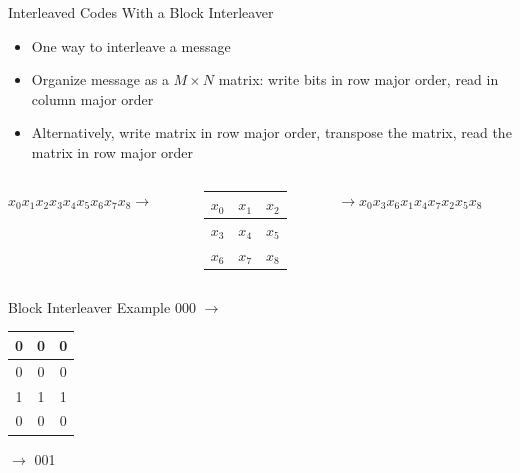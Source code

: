 \documentclass[aspectratio=169]{beamer}
\makeatletter
\newcommand{\err}[1]{{\color{sigma@alertred}#1}}
\newcommand{\blu}[1]{{\color{sigma@mainblue}#1}}
\newcommand{\lgreen}[1]{{\color{LightGreen}#1}}
\makeatother
\begin{document}
\begin{frame}{Interleaved Codes With a Block Interleaver}
    \begin{itemize}
        \item One way to interleave a message
        \item Organize message as a $M \times N$ matrix: write bits in row major order, read in column major order
        \item Alternatively, write matrix in row major order, transpose the matrix, read the matrix in row major order
    \end{itemize}
    \begin{columns}[c]
    \begin{column}{4cm}
    $x_0 x_1 x_2 x_3 x_4 x_5 x_6 x_7 x_8 \to$
    \end{column}
    \begin{column}{2cm}
    \begin{table}
        \centering
        \begin{tabular}{|c|c|c|}
            \hline 
            $x_0$ & $x_1$ & $x_2$ \\ \hline
            $x_3$ & $x_4$ & $x_5$ \\ \hline
            $x_6$ & $x_7$ & $x_8$ \\ \hline
        \end{tabular}
    \end{table}
    \end{column}
    \begin{column}{5cm}
        $\to x_0 x_3 x_6 x_1 x_4 x_7 x_2 x_5 x_8$
    \end{column}
    \end{columns}
\end{frame}


\begin{frame}{Block Interleaver Example}
    000    \pause $\to$ \\
    \begin{table}
        \centering
        \begin{tabular}{|c|c|c|}
            \hline 
            0 & \err{0} & \lgreen{0} \\ \hline
            0 & \err{0} & \blu{0} \\ \hline
            1 & \lgreen{1} & \blu{1} \\ \hline
            \err{0} & \lgreen{0} & \blu{0} \\ \hline
        \end{tabular}
    \end{table} \pause

    $\to$ 001 \quad \err{000} \quad \lgreen{100} \quad \blu{010}
\end{frame}
\end{document}

